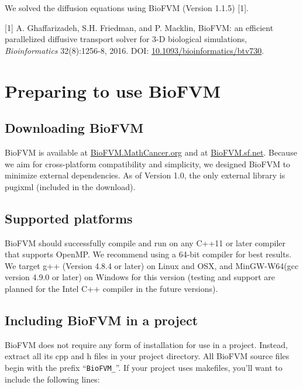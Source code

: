 \documentclass[11pt]{article}
\begin{document}
\begin{adjustwidth}{2.5em}{0pt}
We solved the diffusion equations using BioFVM (Version 1.1.5) [1]. 

[1] A. Ghaffarizadeh, S.H. Friedman, and P. Macklin, BioFVM: an efficient parallelized diffusive transport solver for 3-D biological simulations, \emph{Bioinformatics} 32(8):1256-8, 2016. 
DOI: \href{http://dx.doi.org/10.1093/bioinformatics/btv730}{10.1093/bioinformatics/btv730}.
\end{adjustwidth}


\section{Preparing to use BioFVM}
\subsection{Downloading BioFVM}
BioFVM is available at \href{http://BioFVM.MathCancer.org}{BioFVM.MathCancer.org} and at \href{http://BioFVM.sf.net}{BioFVM.sf.net}.
Because we aim for cross-platform compatibility and simplicity, we designed BioFVM
to minimize external dependencies.  As of Version 1.0, the only external library is pugixml (included in the download).

\subsection{Supported platforms}
BioFVM should successfully compile and run on any C++11 or later compiler that supports OpenMP.
We recommend using a 64-bit compiler for best results. We target g++ (Version 4.8.4 or later)
on Linux and OSX, and MinGW-W64(gcc version 4.9.0 or later) on Windows for this version (testing and support are planned
for the Intel C++ compiler in the future versions).

\subsection{Including BioFVM in a project}
\label{including_biofvm}
BioFVM does not require any form of installation for use in a project. Instead, extract all
its cpp and h files in your project directory. All BioFVM source files begin with the prefix
``\verb:BioFVM_:''. If your project uses makefiles, you'll want to include
the following lines:
\end{document}
